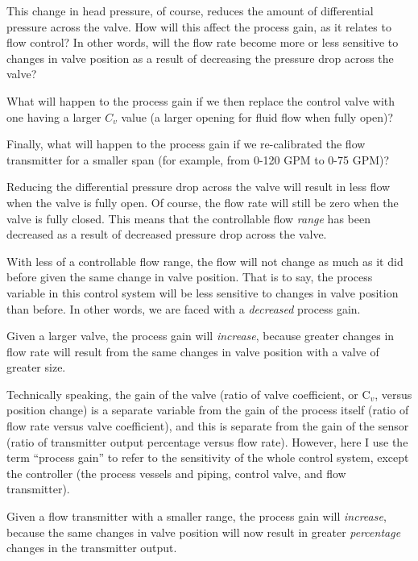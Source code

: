 This change in head pressure, of course, reduces the amount of differential pressure across the valve.  How will this affect the process gain, as it relates to flow control?  In other words, will the flow rate become more or less sensitive to changes in valve position as a result of decreasing the pressure drop across the valve?

\vskip 10pt

What will happen to the process gain if we then replace the control valve with one having a larger $C_v$ value (a larger opening for fluid flow when fully open)?

\vskip 10pt

Finally, what will happen to the process gain if we re-calibrated the flow transmitter for a smaller span (for example, from 0-120 GPM to 0-75 GPM)?







Reducing the differential pressure drop across the valve will result in less flow when the valve is fully open.  Of course, the flow rate will still be zero when the valve is fully closed.  This means that the controllable flow {\it range} has been decreased as a result of decreased pressure drop across the valve.

With less of a controllable flow range, the flow will not change as much as it did before given the same change in valve position.  That is to say, the process variable in this control system will be less sensitive to changes in valve position than before.  In other words, we are faced with a {\it decreased} process gain.

\vskip 10pt

Given a larger valve, the process gain will {\it increase}, because greater changes in flow rate will result from the same changes in valve position with a valve of greater size.

Technically speaking, the gain of the valve (ratio of valve coefficient, or C$_{v}$, versus position change) is a separate variable from the gain of the process itself (ratio of flow rate versus valve coefficient), and this is separate from the gain of the sensor (ratio of transmitter output percentage versus flow rate).  However, here I use the term ``process gain'' to refer to the sensitivity of the whole control system, except the controller (the process vessels and piping, control valve, and flow transmitter).

\vskip 10pt

Given a flow transmitter with a smaller range, the process gain will {\it increase}, because the same changes in valve position will now result in greater {\it percentage} changes in the transmitter output.











